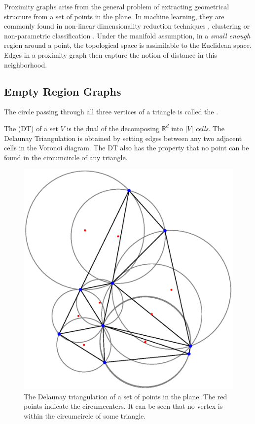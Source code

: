Proximity graphs arise from the general problem of extracting geometrical structure from a set of points in the plane. In machine learning, they are commonly found in non-linear dimensionality reduction techniques \parencite{Tenenbaum2000, Roweis2000}, clustering \parencite{Luxburg2007} or non-parametric classification \parencite{Toussaint2012}. Under the manifold assumption, in a \textit{small enough} region around a point, the topological space is assimilable to the Euclidean space. Edges in a proximity graph then capture the notion of distance in this neighborhood. 

\subsection{Empty Region Graphs}

\begin{defn}
The circle passing through all three vertices of a triangle is called the .
\end{defn}

\begin{defn}
The  (DT) of a set $V$ is the dual of the  decomposing $\mathbb{R}^d$ into $|V|$ \textit{cells}. The Delaunay Triangulation is obtained by setting edges between any two adjacent cells in the Voronoi diagram. The DT also has the property that no point can be found in the circumcircle of any triangle. 
\end{defn}

\begin{figure}
\centering
\includegraphics[scale=0.5]{fig/Delaunay-circle.eps}
\caption{The Delaunay triangulation of a set of points in the plane. The red points indicate the circumcenters. It can be seen that no vertex is within the circumcircle of some triangle.}
\label{fig:delaunay}
\end{figure}

